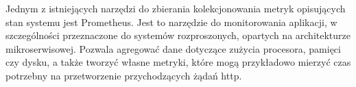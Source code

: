 Jednym z istniejących narzędzi do zbierania kolekcjonowania metryk opisujących
stan systemu jest Prometheus\cite{prometheus2022}. Jest to narzędzie do monitorowania
aplikacji, w szczególności przeznaczone do systemów rozproszonych, opartych na
architekturze mikroserwisowej. Pozwala agregować dane dotyczące zużycia procesora,
pamięci czy dysku, a także tworzyć własne metryki, które mogą przykładowo mierzyć
czas potrzebny na przetworzenie przychodzących żądań http.